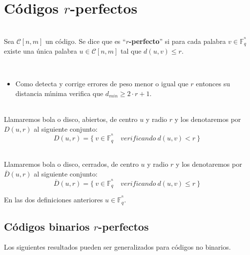 %
%

\chapter{C\'odigos $r$-perfectos}

\begin{definicion}
\ \\
Sea $\mathcal{C}[n,m]$ un c\'odigo. Se dice que es ``\textbf{$r$-perfecto}'' si
para cada palabra $v\in\mathbb{F}^{^n}_q$ existe una \'unica palabra 
$u\in \mathcal{C}[n,m]$ tal que $d(u,v)\leq r$.
\end{definicion}
\begin{observacion}
\ \\
\begin{itemize}
\item Como detecta y corrige errores de peso menor o igual que $r$ entonces su
distancia m\'{\i}nima verifica que $d_{min} \geq 2\cdot r + 1$.
\end{itemize}
\end{observacion}

\begin{definicion}
\ \\
Llamaremos bola o disco, abiertos, de centro $u$ y radio $r$ y los denotaremos
por $D(u,r)$ al siguiente conjunto:
\begin{displaymath}
D(u,r) =\{\ v\in \mathbb{F}^{^n}_q\quad verificando \ d(u,v)< r\ \}
\end{displaymath}
\end{definicion}
\begin{definicion}
\ \\
Llamaremos bola o disco, cerrados, de centro $u$ y radio $r$ y los denotaremos
por $\overline{D}(u,r)$ al siguiente conjunto:
\begin{displaymath}
\overline{D}(u,r)=\{\ v\in \mathbb{F}^{^n}_q\quad verificando\ d(u,v)\leq r\ \}
\end{displaymath}
\end{definicion}
En las dos definiciones anteriores $u\in \mathbb{F}^{^n}_q$.
%
\newpage
%

\section{C\'odigos binarios $r$-perfectos}

Los siguientes resultados pueden ser generalizados para c\'odigos no binarios.

%
%



%
\newpage
%

%
%



%
%



